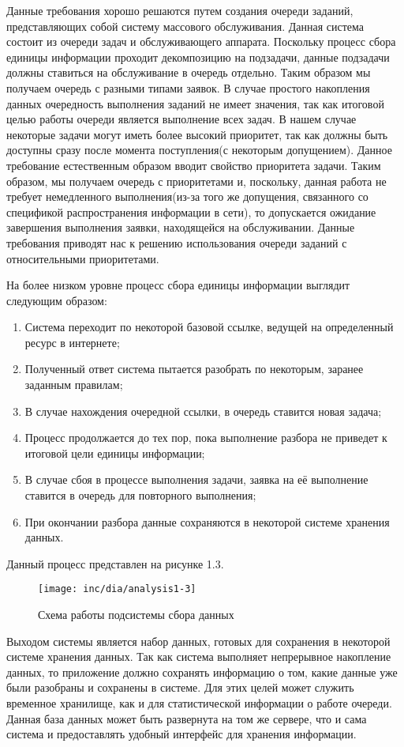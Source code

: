 Данные требования хорошо решаются путем создания очереди заданий, представляющих собой систему массового обслуживания. Данная система состоит из очереди задач и обслуживающего аппарата. Поскольку процесс сбора единицы информации проходит декомпозицию на подзадачи, данные подзадачи должны ставиться на обслуживание в очередь отдельно. Таким образом мы получаем очередь с разными типами заявок. В случае простого накопления данных очередность выполнения заданий не имеет значения, так как итоговой целью работы очереди является выполнение всех задач. В нашем случае некоторые задачи могут иметь более высокий приоритет, так как должны быть доступны сразу после момента поступления(с некоторым допущением).
Данное требование естественным образом вводит свойство приоритета задачи. Таким образом, мы получаем очередь с приоритетами и, поскольку, данная работа не требует немедленного выполнения(из-за того же допущения, связанного со спецификой распространения информации в сети), то допускается ожидание завершения выполнения заявки, находящейся на обслуживании.
Данные требования приводят нас к решению использования очереди заданий с относительными приоритетами. 

На более низком уровне процесс сбора единицы информации выглядит следующим образом:
\begin{enumerate}
\item Система переходит по некоторой базовой ссылке, ведущей на определенный ресурс в интернете;
\item Полученный ответ система пытается разобрать по некоторым, заранее заданным правилам;
\item В случае нахождения очередной ссылки, в очередь ставится новая задача;
\item Процесс продолжается до тех пор, пока выполнение разбора не приведет к итоговой цели единицы информации;
\item В случае сбоя в процессе выполнения задачи, заявка на её выполнение ставится в очередь для повторного выполнения;
\item При окончании разбора данные сохраняются в некоторой системе хранения данных.
\end{enumerate}

Данный процесс представлен на рисунке 1.3.
\begin{figure}
  \centering
  \texttt{[image: inc/dia/analysis1-3]}
  \caption{Схема работы подсистемы сбора данных}
  \label{fig:fig03}
\end{figure}

Выходом системы является набор данных, готовых для сохранения в некоторой системе хранения данных. Так как система выполняет непрерывное накопление данных, то приложение должно сохранять информацию о том, какие данные уже были разобраны и сохранены в системе. Для этих целей может служить временное хранилище, как и для статистической информации о работе очереди. Данная база данных может быть развернута на том же сервере, что и сама система и предоставлять удобный интерфейс для хранения информации.


